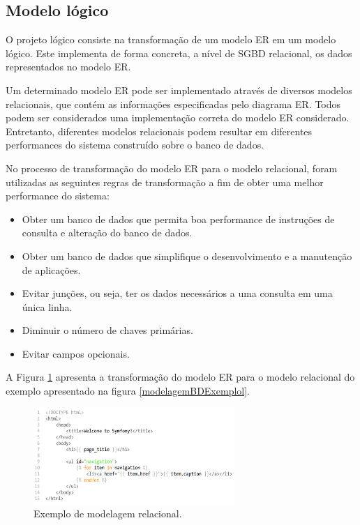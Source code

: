 \subsection{Modelo lógico}
\label{fundBDProjeto}

O projeto lógico consiste na transformação de um modelo ER em um modelo lógico. Este implementa de forma concreta, a nível de SGBD relacional, os dados representados no modelo ER.

Um determinado modelo ER pode ser implementado através de diversos modelos relacionais, que contém as informações especificadas pelo diagrama ER. Todos podem ser considerados uma implementação correta do modelo ER considerado. Entretanto, diferentes modelos relacionais podem resultar em diferentes performances do sistema construído sobre o banco de dados. 

No processo de transformação do modelo ER para o modelo relacional, foram utilizadas as seguintes regras de transformação \cite{heuser} a fim de obter uma melhor performance do sistema: 

\begin{itemize}
    \item Obter um banco de dados que permita boa performance de instruções de consulta e alteração do banco de dados.
    
    \item Obter um banco de dados que simplifique o desenvolvimento e a manutenção de aplicações.
    
    \item Evitar junções, ou seja, ter os dados necessários a uma consulta em uma única linha.
    
    \item Diminuir o número de chaves primárias.
    
    \item Evitar campos opcionais.
    
\end{itemize}

A Figura \ref{modelagemBDLogicoExemplol} apresenta a transformação do modelo ER para o modelo relacional do exemplo apresentado na figura \ref{modelagemBDExemplol}.

\begin{figure}[h]
    \caption{Exemplo de modelagem relacional.}
       	\begin{center}
            \includegraphics[width=0.68\textwidth]{figuras/twig-symf.png}
        \end{center}
    \label{modelagemBDLogicoExemplol}
\end{figure}

